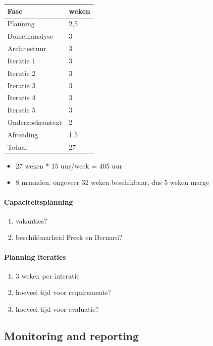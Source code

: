 \begin{tabular}{ll}\hline
{\bf Fase}    & {\bf weken}\\\hline
Planning             & 2,5 \\

Domeinanalyse        & 3 \\
Architectuur         & 3 \\

Iteratie 1           & 3 \\
Iteratie 2           & 3 \\
Iteratie 3           & 3 \\
Iteratie 4           & 3 \\
Iteratie 5           & 3 \\

Onderzoekcontext     &	2 \\

Afronding	     & 1.5 \\
\hline
Totaal               & 27 \\
\end{tabular}



\begin{itemize}
 \item 27 weken * 15 uur/week = 405 uur
 \item 8 maanden, ongeveer 32 weken beschikbaar, dus 5 weken marge
\end{itemize}



\paragraph{Capaciteitsplanning}

\begin{enumerate}
 \item vakanties?
 \item beschikbaarheid Freek en Bernard?
\end{enumerate}

\paragraph{Planning iteraties}
\begin{enumerate}
 \item 3 weken per interatie
 \item hoeveel tijd voor requirements?
 \item hoeveel tijd voor evaluatie?
\end{enumerate}






\subsection{Monitoring and reporting}
